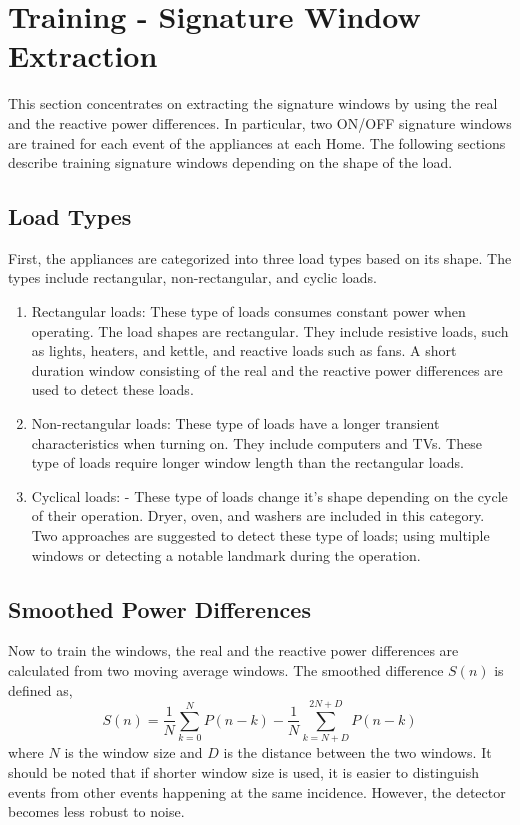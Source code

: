 \documentclass[conference]{IEEEtran}
\begin{document}
\section{Training - Signature Window Extraction}
This section concentrates on extracting the signature windows by using the real and the reactive power differences.  In particular, two ON/OFF signature windows are trained for each event of the appliances at each Home.  The following sections describe training signature windows depending on the shape of the load.  


\subsection{Load Types}
First, the appliances are categorized into three load types based on its shape.  The types include rectangular, non-rectangular, and cyclic loads.  
\begin{enumerate}
\item{Rectangular loads:} These type of loads consumes constant power when operating.  The load shapes are rectangular.  They include resistive loads, such as lights, heaters, and kettle, and reactive loads such as fans.  A short duration window consisting of the real and the reactive power differences are used to detect these loads.
\item{Non-rectangular loads:} These type of loads have a longer transient characteristics when turning on.  They include computers and TVs.  These type of loads require longer window length than the rectangular loads.
\item{Cyclical loads:} - These type of loads change it's shape depending on the cycle of their operation.  Dryer, oven, and washers are included in this category.  Two approaches are suggested to detect these type of loads; using multiple windows or detecting a notable landmark during the operation.
\end{enumerate}

\subsection{Smoothed Power Differences}
Now to train the windows, the real and the reactive power differences are calculated from two moving average windows.  The smoothed difference $S(n)$ is defined as,
\begin{equation}
S(n) = \frac{1}{N}\sum_{k=0}^{N}P(n-k) - \frac{1}{N}\sum_{k=N+D}^{2N+D}P(n-k)
\end{equation}
where $N$ is the window size and $D$ is the distance between the two windows. 
It should be noted that if shorter window size is used, it is easier to distinguish events from other events happening at the same incidence.  However, the detector becomes less robust to noise.
\end{document}
